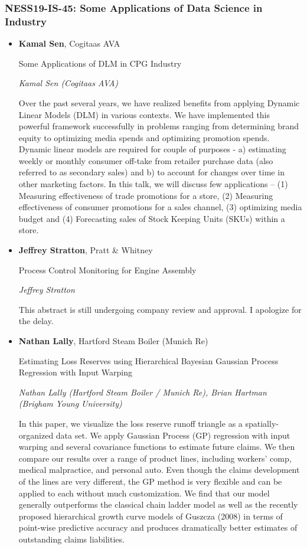 \subsubsection*{NESS19-IS-45: Some Applications of Data Science in Industry}

\begin{itemize}
\item \textbf{Kamal Sen}, Cogitaas AVA

Some Applications of DLM in CPG Industry

\emph{\footnotesize Kamal Sen (Cogitaas AVA)}

Over the past several years, we have realized benefits from applying Dynamic Linear Models (DLM) in various contexts. We have implemented this powerful framework successfully in problems ranging from determining brand equity to optimizing media spends and optimizing promotion spends. Dynamic linear models are required for couple of purposes - a) estimating weekly or monthly consumer off-take from retailer purchase data (also referred to as secondary sales) and b) to account for changes over time in other marketing factors. In this talk, we will discuss few applications -- (1) Measuring effectiveness of trade promotions for a store, (2) Measuring effectiveness of consumer promotions for a sales channel, (3) optimizing media budget and (4) Forecasting sales of Stock Keeping Units (SKUs) within a store.


\item \textbf{Jeffrey Stratton}, Pratt \& Whitney

Process Control Monitoring for Engine Assembly

\emph{\footnotesize Jeffrey Stratton}

This abstract is still undergoing company review and approval.  I apologize for the delay.

\item \textbf{Nathan Lally}, Hartford Steam Boiler (Munich Re)

Estimating Loss Reserves using Hierarchical Bayesian Gaussian Process Regression with Input Warping

\emph{\footnotesize Nathan Lally (Hartford Steam Boiler / Munich Re), Brian Hartman (Brigham Young University)}

In this paper, we visualize the loss reserve runoff triangle as a spatially-organized data set. We apply Gaussian Process (GP) regression with input warping and several covariance functions to estimate future claims. We then compare our results over a range of product lines, including workers’ comp, medical malpractice, and personal auto. Even though the claims development of the lines are very different, the GP method is very flexible and can be applied to each without much customization. We find that our model generally outperforms the classical chain ladder model as well as the recently proposed hierarchical growth curve models of Guszcza (2008) in terms of point-wise predictive accuracy and produces dramatically better estimates of outstanding claims liabilities.

\end{itemize}

